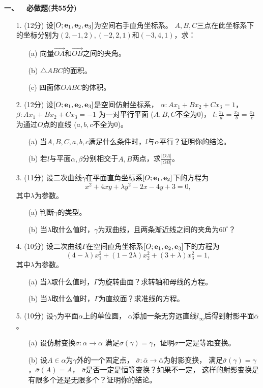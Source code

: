 \textbf{一、\ \ 必做题(共55分)}
\begin{itemize}
    \item[1.] (12分) 设$[O;\mathbf{e}_1,\mathbf{e}_2,\mathbf{e}_3]$为空间右手直角坐标系。
    $A,B,C$三点在此坐标系下的坐标分别为$(2,-1,2),(-2,2,1)$和$(-3,4,1)$，求：
    \begin{itemize}
        \item[(a)] 向量$\overrightarrow{OA}$和$\overrightarrow{OB}$之间的夹角。
        \item[(b)] $\triangle ABC$的面积。
        \item[(c)] 四面体$OABC$的体积。
    \end{itemize}
    \item[2.] (12分) 设$[O;\mathbf{e}_1,\mathbf{e}_2,\mathbf{e}_3]$是空间仿射坐标系，
    $\alpha:Ax_1+Bx_2+Cx_3=1$，$\beta:Ax_1+Bx_2+Cx_3=-1$
    为一对平行平面 ($A,B,C$不全为$0$)，
    $l:\frac{x_1}{a}=\frac{x_2}{b}=\frac{x_3}{c}$
    为通过$O$点的直线 ($a,b,c$不全为$0$)。
    \begin{itemize}
        \item[(a)] 当$A,B,C,a,b,c$满足什么条件时，$l$与$\alpha$平行？证明你的结论。
        \item[(b)] 若$l$与平面$\alpha,\beta$分别相交于$A,B$两点，求$\frac{|OA|}{|OB|}$。
    \end{itemize}
    \item[3.] (11分) 设二次曲线$\gamma$在平面直角坐标系$[O;\mathbf{e}_1,\mathbf{e}_2]$下的方程为
    \[x^2+4xy+\lambda y^2-2x-4y+3=0,\]
    其中$\lambda$为参数。
    \begin{itemize}
        \item[(a)] 判断$\gamma$的类型。
        \item[(b)] 当$\lambda$取什么值时，$\gamma$为双曲线，且两条渐近线之间的夹角为$60^\circ$？
    \end{itemize}
    \item[4.] (10分) 设二次曲线$\Gamma$在空间直角坐标系$[O;\mathbf{e}_1,\mathbf{e}_2,\mathbf{e}_3]$下的方程为
    \[(4-\lambda)x_1^2+(1-2\lambda)x_2^2+(3+\lambda)x_3^2=1,\]
    其中$\lambda$为参数。
    \begin{itemize}
        \item[(a)] 当$\lambda$取什么值时，$\Gamma$为旋转曲面？求转轴和母线的方程。
        \item[(b)] 当$\lambda$取什么值时，$\Gamma$为直纹面？求准线的方程。
    \end{itemize}
    \item[5.] (10分) 设$\gamma$为平面$\alpha$上的单位圆，
    $\alpha$添加一条无穷远直线$l_\infty$后得到射影平面$\bar{\alpha}$。
    \begin{itemize}
        \item[(a)] 设仿射变换$\sigma:\alpha\to\alpha$
        满足$\sigma(\gamma)=\gamma$，证明$\sigma$一定是等距变换。
        \item[(b)] 设$A\in\alpha$为$\gamma$外的一个固定点，
        $\bar{\sigma}:\bar{\alpha}\to\bar{\alpha}$为射影变换，
        满足$\bar{\sigma}(\gamma)=\gamma$，$\bar{\sigma}(A)=A$，
        $\bar{\sigma}$是否一定是恒等变换？如果不一定，
        这样的射影变换是有限多个还是无限多个？证明你的结论。
    \end{itemize}
\end{itemize}
